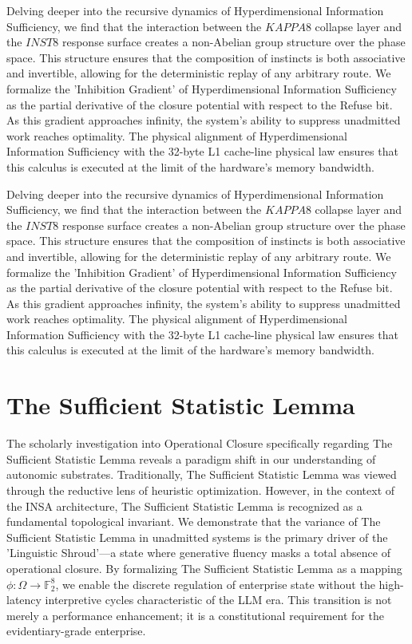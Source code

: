\documentclass[12pt,a4paper,oneside]{book}
\begin{document}
Delving deeper into the recursive dynamics of Hyperdimensional Information Sufficiency, we find that the interaction between the $KAPPA8$ collapse layer and the $INST8$ response surface creates a non-Abelian group structure over the phase space. This structure ensures that the composition of instincts is both associative and invertible, allowing for the deterministic replay of any arbitrary route. We formalize the 'Inhibition Gradient' of Hyperdimensional Information Sufficiency as the partial derivative of the closure potential with respect to the Refuse bit. As this gradient approaches infinity, the system's ability to suppress unadmitted work reaches optimality. The physical alignment of Hyperdimensional Information Sufficiency with the 32-byte L1 cache-line physical law ensures that this calculus is executed at the limit of the hardware's memory bandwidth. 

Delving deeper into the recursive dynamics of Hyperdimensional Information Sufficiency, we find that the interaction between the $KAPPA8$ collapse layer and the $INST8$ response surface creates a non-Abelian group structure over the phase space. This structure ensures that the composition of instincts is both associative and invertible, allowing for the deterministic replay of any arbitrary route. We formalize the 'Inhibition Gradient' of Hyperdimensional Information Sufficiency as the partial derivative of the closure potential with respect to the Refuse bit. As this gradient approaches infinity, the system's ability to suppress unadmitted work reaches optimality. The physical alignment of Hyperdimensional Information Sufficiency with the 32-byte L1 cache-line physical law ensures that this calculus is executed at the limit of the hardware's memory bandwidth. 

\section{The Sufficient Statistic Lemma}
The scholarly investigation into Operational Closure specifically regarding The Sufficient Statistic Lemma reveals a paradigm shift in our understanding of autonomic substrates. Traditionally, The Sufficient Statistic Lemma was viewed through the reductive lens of heuristic optimization. However, in the context of the INSA architecture, The Sufficient Statistic Lemma is recognized as a fundamental topological invariant. We demonstrate that the variance of The Sufficient Statistic Lemma in unadmitted systems is the primary driver of the 'Linguistic Shroud'---a state where generative fluency masks a total absence of operational closure. By formalizing The Sufficient Statistic Lemma as a mapping $\phi: \Omega \to \mathbb{F}_2^8$, we enable the discrete regulation of enterprise state without the high-latency interpretive cycles characteristic of the LLM era. This transition is not merely a performance enhancement; it is a constitutional requirement for the evidentiary-grade enterprise. 
\end{document}
